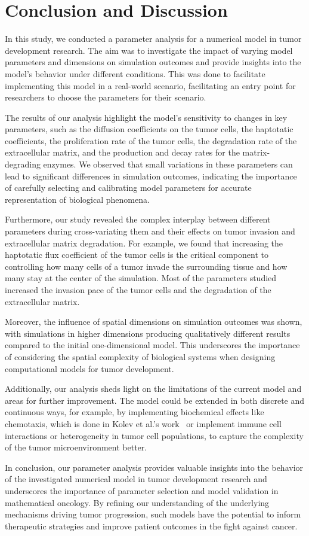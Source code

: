 \section{Conclusion and Discussion}
In this study, we conducted a parameter analysis for a numerical model in tumor development research. The aim was to investigate the impact of varying model parameters and dimensions on simulation outcomes and provide insights into the model's behavior under different conditions. This was done to facilitate implementing this model in a real-world scenario, facilitating an entry point for researchers to choose the parameters for their scenario.

The results of our analysis highlight the model's sensitivity to changes in key parameters, such as the diffusion coefficients on the tumor cells, the haptotatic coefficients, the proliferation rate of the tumor cells, the degradation rate of the extracellular matrix, and the production and decay rates for the matrix-degrading enzymes. We observed that small variations in these parameters can lead to significant differences in simulation outcomes, indicating the importance of carefully selecting and calibrating model parameters for accurate representation of biological phenomena.

Furthermore, our study revealed the complex interplay between different parameters during cross-variating them and their effects on tumor invasion and extracellular matrix degradation. For example, we found that increasing the haptotatic flux coefficient of the tumor cells is the critical component to controlling how many cells of a tumor invade the surrounding tissue and how many stay at the center of the simulation. Most of the parameters studied increased the invasion pace of the tumor cells and the degradation of the extracellular matrix.

Moreover, the influence of spatial dimensions on simulation outcomes was shown, with simulations in higher dimensions producing qualitatively different results compared to the initial one-dimensional model. This underscores the importance of considering the spatial complexity of biological systems when designing computational models for tumor development.

Additionally, our analysis sheds light on the limitations of the current model and areas for further improvement. The model could be extended in both discrete and continuous ways, for example, by implementing biochemical effects like chemotaxis, which is done in Kolev et al.'s work~\cite{Kolev2010} or implement immune cell interactions or heterogeneity in tumor cell populations, to capture the complexity of the tumor microenvironment better.

In conclusion, our parameter analysis provides valuable insights into the behavior of the investigated numerical model in tumor development research and underscores the importance of parameter selection and model validation in mathematical oncology. By refining our understanding of the underlying mechanisms driving tumor progression, such models have the potential to inform therapeutic strategies and improve patient outcomes in the fight against cancer.